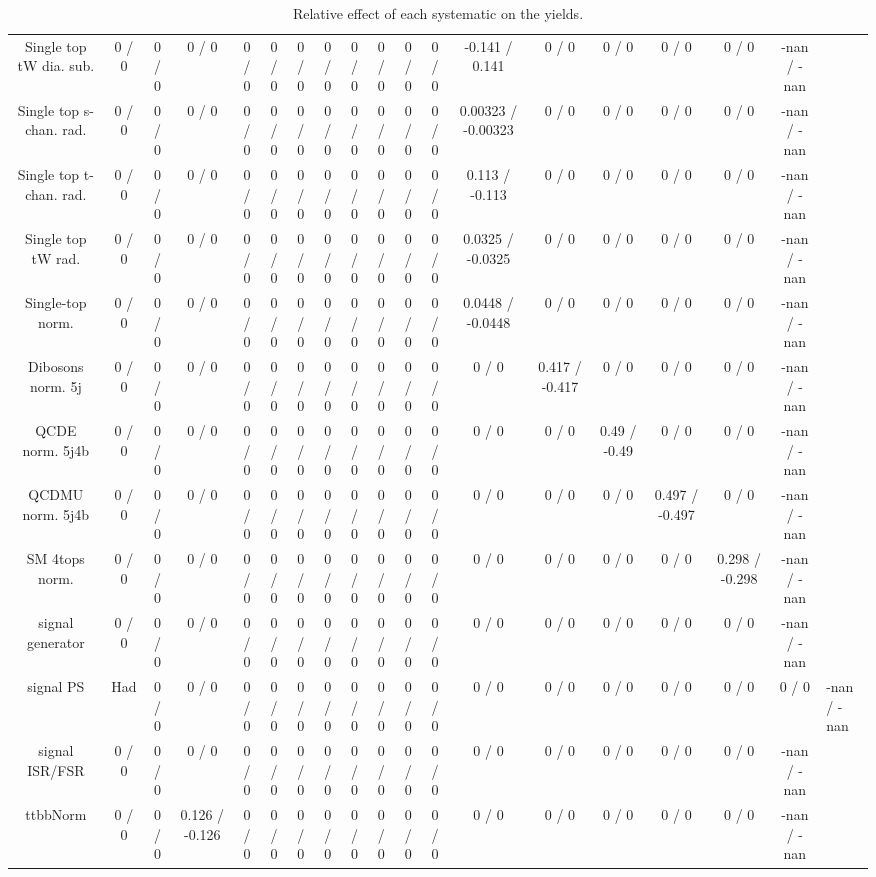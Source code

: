 \documentclass[10pt]{article}
\begin{document}
\begin{table}[htbp]
\begin{center}
\begin{tabular}{|c|c|c|c|c|c|c|c|c|c|c|c|c|c|c|c|c|c|}
  Single top tW dia. sub. & 0 / 0 & 0 / 0 & 0 / 0 & 0 / 0 & 0 / 0 & 0 / 0 & 0 / 0 & 0 / 0 & 0 / 0 & 0 / 0 & 0 / 0 & -0.141 / 0.141 & 0 / 0 & 0 / 0 & 0 / 0 & 0 / 0 & -nan / -nan \\ 
  Single top s-chan. rad. & 0 / 0 & 0 / 0 & 0 / 0 & 0 / 0 & 0 / 0 & 0 / 0 & 0 / 0 & 0 / 0 & 0 / 0 & 0 / 0 & 0 / 0 & 0.00323 / -0.00323 & 0 / 0 & 0 / 0 & 0 / 0 & 0 / 0 & -nan / -nan \\ 
  Single top t-chan. rad. & 0 / 0 & 0 / 0 & 0 / 0 & 0 / 0 & 0 / 0 & 0 / 0 & 0 / 0 & 0 / 0 & 0 / 0 & 0 / 0 & 0 / 0 & 0.113 / -0.113 & 0 / 0 & 0 / 0 & 0 / 0 & 0 / 0 & -nan / -nan \\ 
  Single top tW rad. & 0 / 0 & 0 / 0 & 0 / 0 & 0 / 0 & 0 / 0 & 0 / 0 & 0 / 0 & 0 / 0 & 0 / 0 & 0 / 0 & 0 / 0 & 0.0325 / -0.0325 & 0 / 0 & 0 / 0 & 0 / 0 & 0 / 0 & -nan / -nan \\ 
  Single-top norm. & 0 / 0 & 0 / 0 & 0 / 0 & 0 / 0 & 0 / 0 & 0 / 0 & 0 / 0 & 0 / 0 & 0 / 0 & 0 / 0 & 0 / 0 & 0.0448 / -0.0448 & 0 / 0 & 0 / 0 & 0 / 0 & 0 / 0 & -nan / -nan \\ 
  Dibosons norm. 5j & 0 / 0 & 0 / 0 & 0 / 0 & 0 / 0 & 0 / 0 & 0 / 0 & 0 / 0 & 0 / 0 & 0 / 0 & 0 / 0 & 0 / 0 & 0 / 0 & 0.417 / -0.417 & 0 / 0 & 0 / 0 & 0 / 0 & -nan / -nan \\ 
  QCDE norm. 5j4b & 0 / 0 & 0 / 0 & 0 / 0 & 0 / 0 & 0 / 0 & 0 / 0 & 0 / 0 & 0 / 0 & 0 / 0 & 0 / 0 & 0 / 0 & 0 / 0 & 0 / 0 & 0.49 / -0.49 & 0 / 0 & 0 / 0 & -nan / -nan \\ 
  QCDMU norm. 5j4b & 0 / 0 & 0 / 0 & 0 / 0 & 0 / 0 & 0 / 0 & 0 / 0 & 0 / 0 & 0 / 0 & 0 / 0 & 0 / 0 & 0 / 0 & 0 / 0 & 0 / 0 & 0 / 0 & 0.497 / -0.497 & 0 / 0 & -nan / -nan \\ 
  SM 4tops norm. & 0 / 0 & 0 / 0 & 0 / 0 & 0 / 0 & 0 / 0 & 0 / 0 & 0 / 0 & 0 / 0 & 0 / 0 & 0 / 0 & 0 / 0 & 0 / 0 & 0 / 0 & 0 / 0 & 0 / 0 & 0.298 / -0.298 & -nan / -nan \\ 
  signal generator & 0 / 0 & 0 / 0 & 0 / 0 & 0 / 0 & 0 / 0 & 0 / 0 & 0 / 0 & 0 / 0 & 0 / 0 & 0 / 0 & 0 / 0 & 0 / 0 & 0 / 0 & 0 / 0 & 0 / 0 & 0 / 0 & -nan / -nan \\ 
  signal PS & Had & 0 / 0 & 0 / 0 & 0 / 0 & 0 / 0 & 0 / 0 & 0 / 0 & 0 / 0 & 0 / 0 & 0 / 0 & 0 / 0 & 0 / 0 & 0 / 0 & 0 / 0 & 0 / 0 & 0 / 0 & 0 / 0 & -nan / -nan \\ 
  signal ISR/FSR & 0 / 0 & 0 / 0 & 0 / 0 & 0 / 0 & 0 / 0 & 0 / 0 & 0 / 0 & 0 / 0 & 0 / 0 & 0 / 0 & 0 / 0 & 0 / 0 & 0 / 0 & 0 / 0 & 0 / 0 & 0 / 0 & -nan / -nan \\ 
 ttbbNorm & 0 / 0 & 0 / 0 & 0.126 / -0.126 & 0 / 0 & 0 / 0 & 0 / 0 & 0 / 0 & 0 / 0 & 0 / 0 & 0 / 0 & 0 / 0 & 0 / 0 & 0 / 0 & 0 / 0 & 0 / 0 & 0 / 0 & -nan / -nan \\ 
\hline 
\end{tabular} 
\caption{Relative effect of each systematic on the yields.} 
\end{center} 
\end{table} 
\end{document}
